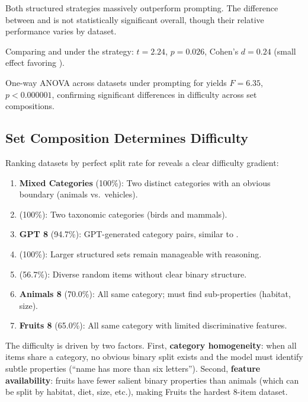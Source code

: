 Both structured strategies massively outperform \basic prompting.
The difference between \chainofthought and \explicit is not statistically significant overall, though their relative performance varies by dataset.

Comparing \gptfull and \gptmini under the \explicit strategy: $t = 2.24$, $p = 0.026$, Cohen's $d = 0.24$ (small effect favoring \gptfull).

One-way ANOVA across datasets under \explicit prompting for \gptfull yields $F = 6.35$, $p < 0.000001$, confirming significant differences in difficulty across set compositions.

\subsection{Set Composition Determines Difficulty}
\label{sec:difficulty}

Ranking datasets by \chainofthought perfect split rate for \gptfull reveals a clear difficulty gradient:

\begin{enumerate}[leftmargin=*,itemsep=0pt,topsep=0pt]
    \item \textbf{Mixed Categories} (100\%): Two distinct categories with an obvious boundary (\eg animals vs.\ vehicles).
    \item \textbf{} (100\%): Two taxonomic categories (\eg birds and mammals).
    \item \textbf{GPT 8} (94.7\%): GPT-generated category pairs, similar to \mcrae.
    \item \textbf{} (100\%): Larger structured sets remain manageable with reasoning.
    \item \textbf{} (56.7\%): Diverse random items without clear binary structure.
    \item \textbf{Animals 8} (70.0\%): All same category; must find sub-properties (\eg habitat, size).
    \item \textbf{Fruits 8} (65.0\%): All same category with limited discriminative features.
\end{enumerate}

The difficulty is driven by two factors.
First, \textbf{category homogeneity}: when all items share a category, no obvious binary split exists and the model must identify subtle properties (\eg ``name has more than six letters'').
Second, \textbf{feature availability}: fruits have fewer salient binary properties than animals (which can be split by habitat, diet, size, etc.), making Fruits the hardest 8-item dataset.

